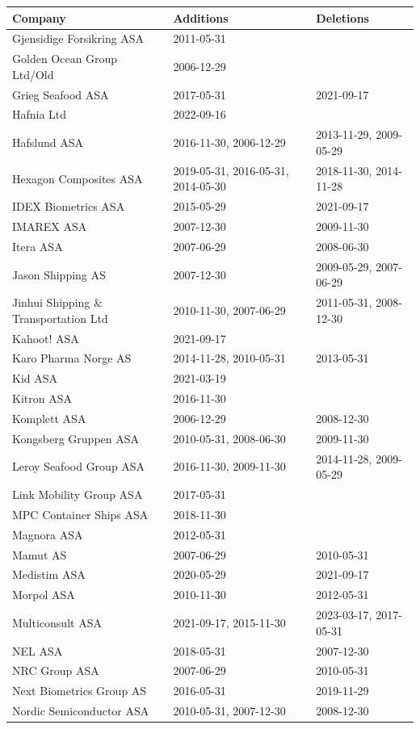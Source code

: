 \begin{table}[H]
\centering
\begin{tabularx}{\textwidth}{XXX}
\toprule
Company & Additions & Deletions \\ 
\midrule
Gjensidige Forsikring ASA & 2011-05-31 & \\
Golden Ocean Group Ltd/Old & 2006-12-29 & \\
Grieg Seafood ASA & 2017-05-31 & 2021-09-17 \\
Hafnia Ltd & 2022-09-16 & \\
Hafslund ASA & 2016-11-30, 2006-12-29 & 2013-11-29, 2009-05-29 \\
Hexagon Composites ASA & 2019-05-31, 2016-05-31, 2014-05-30 & 2018-11-30, 2014-11-28 \\
IDEX Biometrics ASA & 2015-05-29 & 2021-09-17 \\
IMAREX ASA & 2007-12-30 & 2009-11-30 \\
Itera ASA & 2007-06-29 & 2008-06-30 \\
Jason Shipping AS & 2007-12-30 & 2009-05-29, 2007-06-29 \\
Jinhui Shipping \& Transportation Ltd & 2010-11-30, 2007-06-29 & 2011-05-31, 2008-12-30 \\
Kahoot! ASA & 2021-09-17 & \\
Karo Pharma Norge AS & 2014-11-28, 2010-05-31 & 2013-05-31 \\
Kid ASA & 2021-03-19 & \\
Kitron ASA & 2016-11-30 & \\
Komplett ASA & 2006-12-29 & 2008-12-30 \\
Kongsberg Gruppen ASA & 2010-05-31, 2008-06-30 & 2009-11-30 \\
Leroy Seafood Group ASA & 2016-11-30, 2009-11-30 & 2014-11-28, 2009-05-29 \\
Link Mobility Group ASA & 2017-05-31 & \\
MPC Container Ships ASA & 2018-11-30 & \\
Magnora ASA & 2012-05-31 & \\
Mamut AS & 2007-06-29 & 2010-05-31 \\
Medistim ASA & 2020-05-29 & 2021-09-17 \\
Morpol ASA & 2010-11-30 & 2012-05-31 \\
Multiconsult ASA & 2021-09-17, 2015-11-30 & 2023-03-17, 2017-05-31 \\
NEL ASA & 2018-05-31 & 2007-12-30 \\
NRC Group ASA & 2007-06-29 & 2010-05-31 \\
Next Biometrics Group AS & 2016-05-31 & 2019-11-29 \\
Nordic Semiconductor ASA & 2010-05-31, 2007-12-30 & 2008-12-30 \\
\bottomrule
\end{tabularx}
\end{table}

